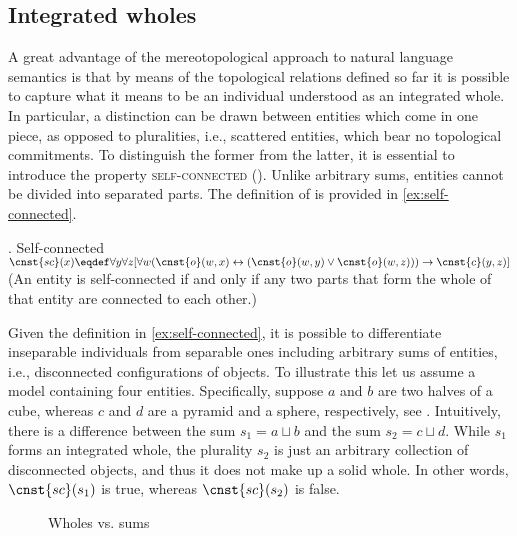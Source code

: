 \subsection{Integrated wholes}\label{sec:integrated-wholes}

A great advantage of the mereotopological approach to natural language semantics is that by means of the topological relations defined so far it is possible to capture what it means to be an individual understood as an integrated whole. In particular, a distinction can be drawn between entities which come in one piece, as opposed to pluralities, i.e., scattered entities, which bear no topological commitments. To distinguish the former from the latter, it is essential to introduce the property \textsc{self-connected} (). Unlike arbitrary sums,  entities cannot be divided into separated parts. The definition of  is provided in \ref{ex:self-connected}.
	
	\ex. Self-connected \citep[p. 57; adapted]{casati_varzi1999parts}\label{ex:self-connected}\\
    $\cnst{sc}(x) \eqdef \forall y \forall z[\forall w(\cnst{o}(w,x) \leftrightarrow (\cnst{o}(w,y) \vee \cnst{o}(w,z))) \rightarrow \cnst{c}(y,z)]$\\
	(An entity is self-connected if and only if any two parts that form the whole of that entity are connected to each other.)
	
    Given the definition in \ref{ex:self-connected}, it is possible to differentiate inseparable individuals from separable ones including arbitrary sums of entities, i.e., disconnected configurations of objects. To illustrate this let us assume a model containing four entities. Specifically, suppose $a$ and $b$ are two halves of a cube, whereas $c$ and $d$ are a pyramid and a sphere, respectively, see . Intuitively, there is a difference between the sum $s_1 = a \sqcup b$ and the sum $s_2 = c \sqcup d$. While $s_1$ forms an integrated whole, the plurality $s_2$ is just an arbitrary collection of disconnected objects, and thus it does not make up a solid whole. In other words, $\cnst{sc}(s_1)$ is true, whereas $\cnst{sc}(s_2)$ is false. 
    
\begin{figure}[h!]
\centering
{}
\caption{Wholes vs. sums}
\label{fig:wholes-sums}
\end{figure}      
    
